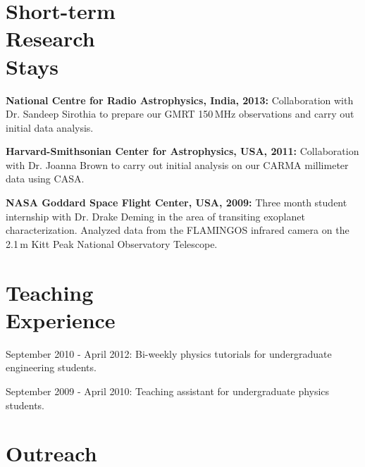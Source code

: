 \documentclass[margin,line]{resume}
\begin{document}
\begin{resume}
    \section{\mysidestyle Short-term\\Research\\Stays}

\textbf{National Centre for Radio Astrophysics, India, 2013:} Collaboration with Dr. Sandeep Sirothia to prepare our GMRT 150\,MHz observations and carry out initial data analysis.

\textbf{Harvard-Smithsonian Center for Astrophysics, USA, 2011:} Collaboration with Dr. Joanna Brown to carry out initial analysis on our CARMA millimeter data using CASA. 

\textbf{NASA Goddard Space Flight Center, USA, 2009:} Three month student internship with Dr. Drake Deming in the area of transiting exoplanet characterization. Analyzed data from the FLAMINGOS infrared camera on the 2.1\,m Kitt Peak National Observatory Telescope.

    \vspace{2mm}
    \section{\mysidestyle Teaching\\Experience}

	\begin{list2}
    \item September 2010 - April 2012: Bi-weekly physics tutorials for undergraduate engineering students.
    \item September 2009 - April 2010: Teaching assistant for undergraduate physics students. \vspace{-1mm}\\%
    \end{list2}

    \vspace{0mm}
    \section{\mysidestyle Outreach}


\end{resume}
\end{document}
